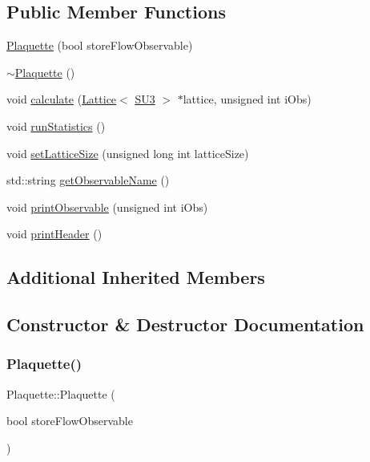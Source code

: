 \subsection*{Public Member Functions}
\begin{DoxyCompactItemize}
\item 
\mbox{\hyperlink{class_plaquette_a1c87b43fc7ee74b2b0289de63e03bb61}{Plaquette}} (bool store\+Flow\+Observable)
\item 
\mbox{\hyperlink{class_plaquette_a8730cb08bee0e0f9260bf8f11f52b8c0}{$\sim$\+Plaquette}} ()
\item 
void \mbox{\hyperlink{class_plaquette_a40cae6fd587c14836bdf61e69c615a00}{calculate}} (\mbox{\hyperlink{class_lattice}{Lattice}}$<$ \mbox{\hyperlink{class_s_u3}{S\+U3}} $>$ $\ast$lattice, unsigned int i\+Obs)
\item 
void \mbox{\hyperlink{class_plaquette_aa54bf1807d9b192048026f94d585fa4f}{run\+Statistics}} ()
\item 
void \mbox{\hyperlink{class_plaquette_a011e1ca450fb40273ec8efa6d094c279}{set\+Lattice\+Size}} (unsigned long int lattice\+Size)
\item 
std\+::string \mbox{\hyperlink{class_plaquette_a86de9d267ae1bc6a8c6d3335837ea683}{get\+Observable\+Name}} ()
\item 
void \mbox{\hyperlink{class_plaquette_aa15bf42749c9fd995d4d572ca3ed4f22}{print\+Observable}} (unsigned int i\+Obs)
\item 
void \mbox{\hyperlink{class_plaquette_aef85b75fe7ce4780eeacf96c5da1b4b4}{print\+Header}} ()
\end{DoxyCompactItemize}
\subsection*{Additional Inherited Members}


\subsection{Constructor \& Destructor Documentation}
\mbox{\label{class_plaquette_a1c87b43fc7ee74b2b0289de63e03bb61}} 
\subsubsection{\texorpdfstring{Plaquette()}{Plaquette()}}
{\footnotesize\ttfamily Plaquette\+::\+Plaquette (\begin{DoxyParamCaption}\item[{bool}]{store\+Flow\+Observable }\end{DoxyParamCaption})}

